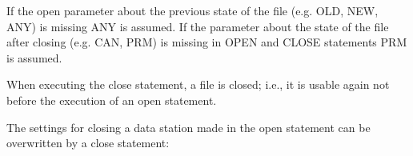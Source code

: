 
If the open parameter about the previous state of the file (e.g. OLD, NEW, ANY)
is missing ANY is assumed.
If the parameter about the state of the file after closing (e.g. CAN, PRM)
is missing in OPEN and CLOSE statements PRM is assumed.

When executing the close statement, a file is closed; i.e., it is
usable again not before the execution of an open statement.




The settings for closing a data station made in the open statement can
be overwritten by a close statement:




